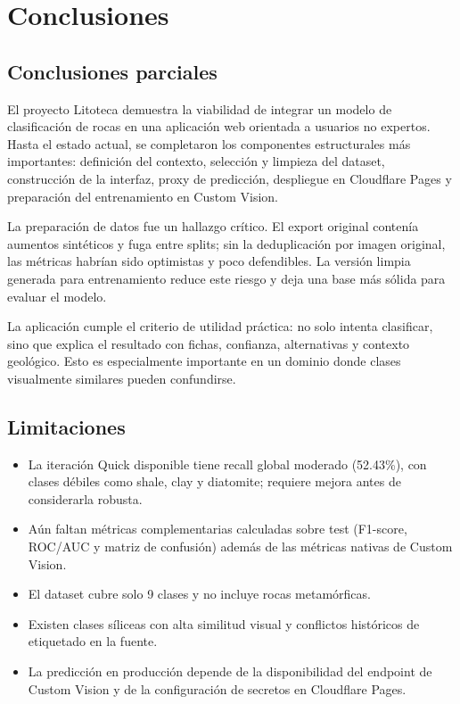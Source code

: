 \chapter{Conclusiones}
\label{ch:conclusions}

\section{Conclusiones parciales}

El proyecto Litoteca demuestra la viabilidad de integrar un modelo de clasificación
de rocas en una aplicación web orientada a usuarios no expertos. Hasta el estado
actual, se completaron los componentes estructurales más importantes: definición del
contexto, selección y limpieza del dataset, construcción de la interfaz, proxy de
predicción, despliegue en Cloudflare Pages y preparación del entrenamiento en Custom
Vision.

La preparación de datos fue un hallazgo crítico. El export original contenía
aumentos sintéticos y fuga entre splits; sin la deduplicación por imagen original,
las métricas habrían sido optimistas y poco defendibles. La versión limpia generada
para entrenamiento reduce este riesgo y deja una base más sólida para evaluar el
modelo.

La aplicación cumple el criterio de utilidad práctica: no solo intenta clasificar,
sino que explica el resultado con fichas, confianza, alternativas y contexto
geológico. Esto es especialmente importante en un dominio donde clases visualmente
similares pueden confundirse.

\section{Limitaciones}

\begin{itemize}
  \item La iteración Quick disponible tiene recall global moderado (52.43\%), con
        clases débiles como shale, clay y diatomite; requiere mejora antes de
        considerarla robusta.
  \item Aún faltan métricas complementarias calculadas sobre test (F1-score, ROC/AUC
        y matriz de confusión) además de las métricas nativas de Custom Vision.
  \item El dataset cubre solo 9 clases y no incluye rocas metamórficas.
  \item Existen clases síliceas con alta similitud visual y conflictos históricos de
        etiquetado en la fuente.
  \item La predicción en producción depende de la disponibilidad del endpoint de
        Custom Vision y de la configuración de secretos en Cloudflare Pages.
\end{itemize}

